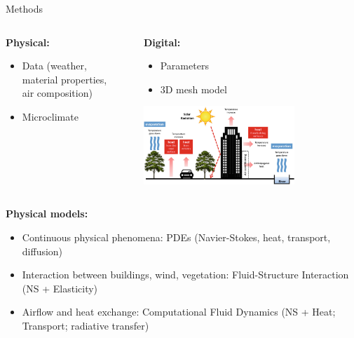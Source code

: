 \documentclass{beamer}
\begin{document}
\begin{frame}{Methods}
    \small
    \begin{columns}[T]
        \begin{column}{0.45\textwidth}
            \textbf{Physical:} \\
            \begin{itemize}
                \item Data (weather, material properties, air composition)
                \item Microclimate
            \end{itemize}
        \end{column}
        \begin{column}{0.1\textwidth}
            \begin{center}
            \end{center}
        \end{column}
        \begin{column}{0.45\textwidth}
            \textbf{Digital:}
            \begin{itemize}
                \item Parameters
                \item 3D mesh model
            \end{itemize}
            \vspace{0.3cm}
            \includegraphics[width=0.7\textwidth]{images/micro-climat_scheme.png} \\
        \end{column}
    \end{columns}

    \vspace{-0.4cm}
    \textbf{Physical models:}
    \begin{itemize}
        \item Continuous physical phenomena: PDEs (Navier-Stokes, heat, transport, diffusion)
        \item Interaction between buildings, wind, vegetation: Fluid-Structure Interaction (NS + Elasticity)
        \item Airflow and heat exchange: Computational Fluid Dynamics (NS + Heat; Transport; radiative transfer) %
    \end{itemize}
\end{frame}
\end{document}
